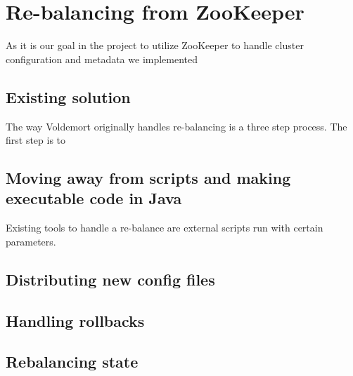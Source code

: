 \section{Re-balancing from ZooKeeper}
As it is our goal in the project to utilize ZooKeeper to handle cluster configuration and metadata we implemented 



\subsection{Existing solution}
The way Voldemort originally handles re-balancing is a three step process. The first step is to 

\subsection{Moving away from scripts and making executable code in Java}
Existing tools to handle a re-balance are external scripts run with certain parameters. 

\subsection{Distributing new config files}

\subsection{Handling rollbacks}

\subsection{Rebalancing state} 